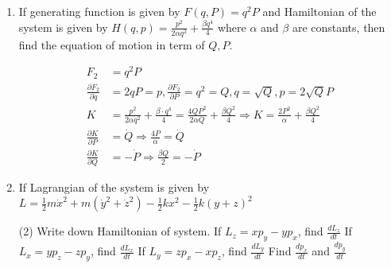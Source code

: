 \begin{enumerate}
\begin{answer}
	\begin{figure}[H]
		\centering
		\texttt{[image: CT-03]}
	\end{figure}
(d)	\begin{figure}[H]
	\centering
	\texttt{[image: CT-02]}
\end{figure}
$\hspace{2.5cm}$where $P=\frac{E}{\omega}$\\
(e)
	\begin{figure}[H]
	\centering
	\texttt{[image: CT-01]}
\end{figure}
\end{answer}
	\item If generating function is given by $F(q, P)=q^{2} P$ and Hamiltonian of the system is given by $H(q, p)=\frac{p^{2}}{2 \alpha q^{2}}+\frac{\beta q^{4}}{4}$ where $\alpha$ and $\beta$ are constants, then find the equation of motion in term of $Q, P$.
	\begin{answer}
		\begin{align*}
		F_{2}&=q^{2} P\\
		\frac{\partial F_{2}}{\partial q}&=2 q P=p, \frac{\partial F_{2}}{\partial P}=q^{2}=Q, q=\sqrt{Q}, p=2 \sqrt{Q} P\\
		K&=\frac{p^{2}}{2 \alpha q^{2}}+\frac{\beta \cdot q^{4}}{4}=\frac{4 Q P^{2}}{2 \alpha Q}+\frac{\beta Q^{2}}{4} \Rightarrow K=\frac{2 P^{2}}{\alpha}+\frac{\beta Q^{2}}{4}\\
	\frac{\partial K}{\partial P}&=\dot{Q} \Rightarrow \frac{4 P}{\alpha}=\dot{Q} \\
		\frac{\partial K}{\partial Q}&=-\dot{P} \Rightarrow \frac{\beta Q}{2}=-\dot{P}
		\end{align*}
	\end{answer}
	\item If Lagrangian of the system is given by $L=\frac{1}{2} m \dot{x}^{2}+m\left(\dot{y}^{2}+\dot{z}^{2}\right)-\frac{1}{2} k x^{2}-\frac{1}{2} k(y+z)^{2}$
	 \begin{tasks}(2)
		\task[\textbf{a.}]Write down Hamiltonian of system.
		\task[\textbf{b.}]If $L_{z}=x p_{y}-y p_{x}$, find $\frac{d L_{z}}{d t}$
		\task[\textbf{c.}]If $L_{x}=y p_{z}-z p_{y}$, find $\frac{d L_{x}}{d t}$
		\task[\textbf{d.}] If $L_{y}=z p_{x}-x p_{z}$, find $\frac{d L_{y}}{d t}$
		\task[\textbf{e.}] Find $\frac{d p_{x}}{d t}$ and $\frac{d p_{y}}{d t}$
	\end{tasks}
\begin{answer}
	\begin{align*}

\end{align*}
\end{answer}
\end{enumerate}
